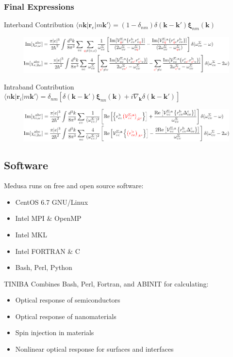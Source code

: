\documentclass{beamer}
\begin{document}
\begin{frame}
\frametitle{Final Expressions}
\begin{block}{Interband Contribution {\tiny $\langle n\mathbf{k}|
\mathbf{r}_{e} |m\mathbf{k}'\rangle = (1- \delta_{nm})
\delta(\mathbf{k}-\mathbf{k}')\boldsymbol{\xi}_{nm}(\mathbf{k})$}}
\begin{figure}
\centering
\includegraphics[scale=0.70]{chis_inter_red}
\end{figure}
\end{block}
\begin{alertblock}{Intraband Contribution {\tiny $\langle n\mathbf{k}\vert
\mathbf{r}_{i} |m\mathbf{k}'\rangle = \delta_{nm}
\left[\delta(\mathbf{k} - \mathbf{k}')\boldsymbol{\xi}_{nn}(\mathbf{k}) +
i\nabla_{\mathbf{k}}\delta(\mathbf{k} - \mathbf{k}')\right]$}}
\begin{figure}
\centering
\includegraphics[scale=0.70]{chis_intra_red}
\end{figure}
\end{alertblock}
\end{frame}

\subsection{Software}
\begin{frame}
Medusa runs on free and open source software:
\begin{itemize}
\item CentOS 6.7 GNU/Linux
\item Intel MPI \& OpenMP
\item Intel MKL
\item Intel FORTRAN \& C
\item Bash, Perl, Python
\end{itemize}
\begin{block}{TINIBA}
Combines Bash, Perl, Fortran, and ABINIT for calculating:
\begin{itemize}
\item Optical response of semiconductors
\item Optical response of nanomaterials
\item Spin injection in materials
\item Nonlinear optical response for surfaces and interfaces
\end{itemize}
\end{block}
\end{frame}
\end{document}
